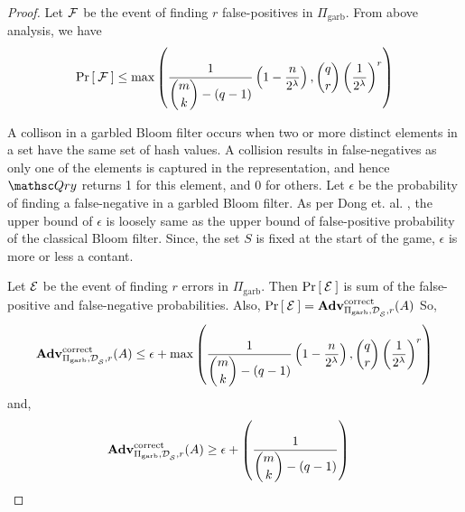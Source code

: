 \begin{proof}
Let ${\cal F}$ be the event of finding $r$ false-positives in $\Pi_{\mathrm{garb}}$. From above analysis, we have
\begin{align*}
\Pr\left[\: {\cal F} \:\right] \leq  \max\left(\dfrac{1}{\dbinom{m}{k}-(q-1)}\left(1-\dfrac{n}{2^\lambda}\right), \dbinom{q}{r}\left(\dfrac{1}{2^\lambda}\right)^r \right)
\end{align*}

A collison in a garbled Bloom filter occurs when two or more distinct elements in a set have the same set of hash values. A collision results in false-negatives as only one of the elements is captured in the representation, and hence $\Qry$ returns 1 for this element, and 0 for others. Let $\epsilon$ be the probability of finding a false-negative in a garbled Bloom filter. As per Dong et. al. \cite{dong2013private}, the upper bound of $\epsilon$  is loosely same as the upper bound of false-positive probability of the classical Bloom filter. Since, the set $S$ is fixed at the start of the game, $\epsilon$ is more or less a contant.

Let ${\cal E}$ be the event of finding $r$ errors in $\Pi_{\mathrm{garb}}$. Then $\Pr\left[\: {\cal E} \:\right]$ is sum of the false-positive and false-negative probabilities. Also, $\Pr\left[\: {\cal E} \:\right] = \mathrm{\mathbf{Adv}}^{\mathrm{correct}}_{\Pi_{\mathrm{garb}},\mathcal{D}_{{\cal S}}^{},r}(A)$ So, 
\begin{align*}
\mathrm{\mathbf{Adv}}^{\mathrm{correct}}_{\Pi_{\mathrm{garb}},\mathcal{D}_{{\cal S}}^{},r}(A) \leq \epsilon +  \max\left(\dfrac{1}{\dbinom{m}{k}-(q-1)}\left(1-\dfrac{n}{2^\lambda}\right), \dbinom{q}{r}\left(\dfrac{1}{2^\lambda}\right)^r \right)
\end{align*}
and,
\begin{align*}
\mathrm{\mathbf{Adv}}^{\mathrm{correct}}_{\Pi_{\mathrm{garb}},\mathcal{D}_{{\cal S}}^{},r}(A) & \geq \epsilon + \left(\dfrac{1}{\dbinom{m}{k}-(q-1)}\right)
\end{align*}


\end{proof}
